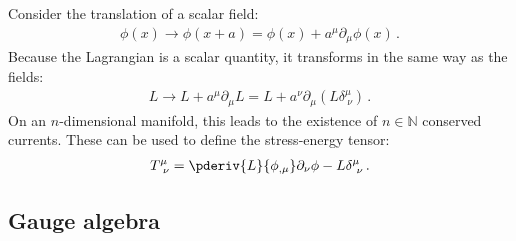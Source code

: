     \begin{definition}
        Consider the translation of a scalar field:
        \begin{gather}
            \phi(x)\longrightarrow\phi(x+a) = \phi(x) + a^\mu\partial_\mu\phi(x)\,.
        \end{gather}
        Because the Lagrangian is a scalar quantity, it transforms in the same way as the fields:
        \begin{gather}
            L\longrightarrow L + a^\mu\partial_\mu L = L + a^\nu\partial_\mu(L\delta^\mu_{\ \nu})\,.
        \end{gather}
        On an $n$-dimensional manifold, this leads to the existence of $n\in\mathbb{N}$ conserved currents. These can be used to define the stress-energy tensor:
        \begin{gather}
            \label{field:stress_energy_tensor}
            T^\mu_{\ \nu} = \pderiv{L}{\phi_{,\mu}}\partial_\nu\phi - L\delta^\mu_{\ \nu}\,.
        \end{gather}
    \end{definition}

\subsection{Gauge algebra}

